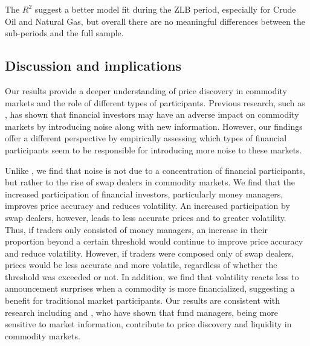 The $R^2$ suggest a better model fit during the ZLB period, especially for Crude Oil and Natural Gas, but overall there are no meaningful differences between the sub-periods and the full sample.
\subsection{Discussion and implications}

Our results provide a deeper understanding of price discovery in commodity markets and the role of different types of participants. Previous research, such as \citet{goldstein2022commodity}, has shown that  financial investors may have an adverse impact on commodity markets by introducing noise along with new information. However, our findings offer a different perspective by empirically assessing which types of financial participants seem to be responsible for introducing more noise to these markets.


Unlike \citet{goldstein2022commodity}, we find that noise is not due to a concentration of financial participants, but rather to the rise of swap dealers in commodity markets. We find that the increased participation of financial investors, particularly money managers, improves price accuracy and reduces volatility. An increased participation by swap dealers, however, leads to less accurate prices and to greater volatility. Thus, if traders only consisted of money managers, an increase in their proportion beyond a certain threshold would continue to improve price accuracy and reduce volatility. However, if traders were composed only of swap dealers, prices would be less accurate and more volatile, regardless of whether the threshold was exceeded or not.
In addition, we find that volatility reacts less to announcement surprises when a commodity is more financialized, suggesting a benefit for traditional market participants. Our results are consistent with research including \citet*{brunetti2009speculation} and \citet*{cheng2015convective}, who have shown that fund managers, being more sensitive to market information, contribute to price discovery and liquidity in commodity markets.


